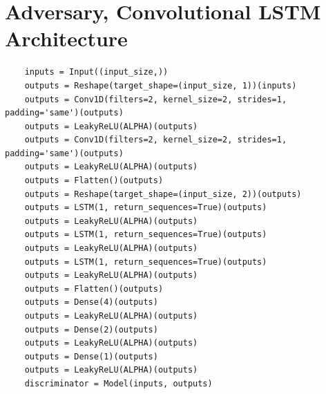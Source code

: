 \documentclass[12pt, titlepage]{report}
\theoremstyle{definition}
\begin{document}
\section{Adversary, Convolutional LSTM Architecture}\label{appendix:convlstm}
\begin{verbatim}
    inputs = Input((input_size,))
    outputs = Reshape(target_shape=(input_size, 1))(inputs)
    outputs = Conv1D(filters=2, kernel_size=2, strides=1, padding='same')(outputs)
    outputs = LeakyReLU(ALPHA)(outputs)
    outputs = Conv1D(filters=2, kernel_size=2, strides=1, padding='same')(outputs)
    outputs = LeakyReLU(ALPHA)(outputs)
    outputs = Flatten()(outputs)
    outputs = Reshape(target_shape=(input_size, 2))(outputs)
    outputs = LSTM(1, return_sequences=True)(outputs)
    outputs = LeakyReLU(ALPHA)(outputs)
    outputs = LSTM(1, return_sequences=True)(outputs)
    outputs = LeakyReLU(ALPHA)(outputs)
    outputs = LSTM(1, return_sequences=True)(outputs)
    outputs = LeakyReLU(ALPHA)(outputs)
    outputs = Flatten()(outputs)
    outputs = Dense(4)(outputs)
    outputs = LeakyReLU(ALPHA)(outputs)
    outputs = Dense(2)(outputs)
    outputs = LeakyReLU(ALPHA)(outputs)
    outputs = Dense(1)(outputs)
    outputs = LeakyReLU(ALPHA)(outputs)
    discriminator = Model(inputs, outputs)
\end{verbatim}
\end{document}

